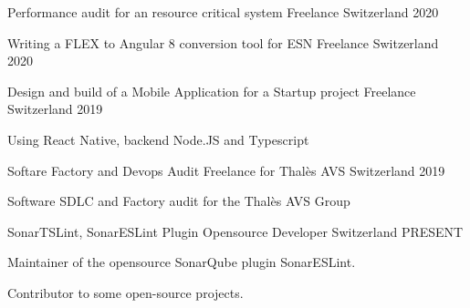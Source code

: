 

\begin{cventries}
\cventry
{Performance audit for an resource critical system} %
{Freelance} %
{Switzerland} %
{2020} %
{
  \begin{cvitems} %
  \end{cvitems}
}
\cventry
{Writing a FLEX to Angular 8 conversion tool for ESN} %
{Freelance} %
{Switzerland} %
{2020} %
{
  \begin{cvitems} %
  \end{cvitems}
}

\cventry
{Design and build of a Mobile Application for a Startup project} %
{Freelance} %
{Switzerland} %
{2019} %
{
  \begin{cvitems} %
  \item {Using React Native, backend Node.JS and Typescript}
  \end{cvitems}
}

\cventry
{Softare Factory and Devops Audit} %
{Freelance for Thalès AVS} %
{Switzerland} %
{2019} %
{
  \begin{cvitems} %
  \item {Software SDLC and Factory audit for the Thalès AVS Group}
  \end{cvitems}
}

  \cventry
    {SonarTSLint, SonarESLint Plugin} %
    {Opensource Developer} %
    {Switzerland} %
    {PRESENT} %
    {
      \begin{cvitems} %
        \item {Maintainer of the opensource SonarQube plugin SonarESLint.}
		\item {Contributor to some open-source projects.}
      \end{cvitems}
    }


\end{cventries}
